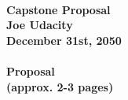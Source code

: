 \documentclass[A4]{report}
\begin{document}
	\paragraph{{\Huge\textbf{Capstone Proposal}} \\ \textnormal{Joe Udacity \\ December 31st, 2050}}
	
	\paragraph{{\Huge\textbf{Proposal}}\\ \textnormal{(approx. 2-3 pages)}}
	
		\setcounter{page}{1}
		
		
		
		
		
		
		
		\pagebreak
		\printbibliography
		
		
\end{document}
